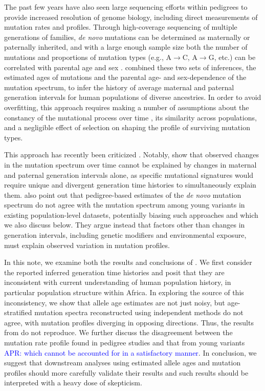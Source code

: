 \documentclass[]{article}
\newcommand{\aprcomment}[1]{{\textcolor{blue}{APR: #1}}}
\begin{document}
The past few years have also seen large sequencing efforts within pedigrees to
provide increased resolution of genome biology, including direct measurements
of mutation rates and profiles. Through high-coverage sequencing of multiple
generations of families, \emph{de novo} mutations can be determined as
maternally or paternally inherited, and with a large enough sample size both
the number of mutations and proportions of mutation types (e.g.,
A$\rightarrow$C, A$\rightarrow$G, etc.) can be correlated with parental age and
sex \citep{jonsson2017parental,halldorsson2019characterizing}.
\citet{wang2023human} combined these two sets of inferences, the estimated ages
of mutations and the parental age- and sex-dependence of the mutation spectrum,
to infer the history of average maternal and paternal generation intervals for
human populations of diverse ancestries. In order to avoid overfitting, this
approach requires making a number of assumptions about the constancy of the
mutational process over time \cite{harris,dewitt}, its similarity across
populations, and a negligible effect of selection on shaping the profile of
surviving mutation types.

This approach has recently been criticized \citep{gao2022limited}. Notably,
\citet{gao2022limited} show that observed changes in the mutation spectrum
over time cannot be explained by changes in maternal and paternal generation
intervals alone, as specific mutational signatures would require unique and
divergent generation time histories to simultaneously explain them.
\citet{gao2022limited} also point out that pedigree-based estimates of the
\emph{de novo} mutation spectrum do not agree with the mutation spectrum among
young variants in existing population-level datasets, potentially biasing such
approaches and which we also discuss below. They argue instead that factors
other than changes in generation intervals, including genetic modifiers and
environmental exposure, must explain observed variation in mutation profiles.

In this note, we examine both the results and conclusions of
\citet{wang2023human}. We first consider the reported inferred generation time
histories and posit that they are inconsistent with current understanding of
human population history, in particular population structure within Africa. In
exploring the source of this inconsistency, we show that allele age estimates
are not just noisy, but age-stratified mutation spectra reconstructed using
independent methods do not agree, with mutation profiles diverging in opposing
directions. Thus, the results from \citet{wang2023human} do not reproduce. We
further discuss the disagreement between the mutation rate profile found in
pedigree studies and that from young variants \aprcomment{which cannot be
accounted for in a satisfactory manner}. In conclusion, we suggest that
downstream analyses using estimated allele ages and mutation profiles should
more carefully validate their results and such results should be interpreted
with a heavy dose of skepticism.
\end{document}
